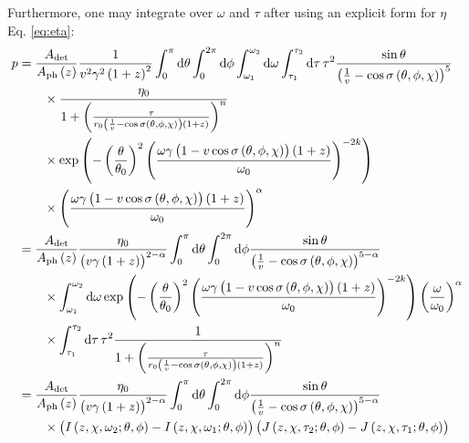 \documentclass[manuscript]{aastex}
\begin{document}
Furthermore, one may integrate over $\omega$ and $\tau$ after using an
explicit form for $\eta$ Eq. \ref{eq:eta}:
\begin{align}
p &= \frac{A_\text{det}}{A_\text{ph}\left(z\right)} \frac{1}{v^2 \gamma^2 \left(1+z\right)^2} \int_0^{\pi} \dif \theta \int_0^{2\pi} \dif \phi \int_{\omega_1}^{\omega_2} \dif \omega \int_{\tau_1}^{\tau_2} \dif \tau \, \tau^2 \frac{\sin\theta}{\left(\frac{1}{v} - \cos\sigma\left(\theta, \phi, \chi\right)\right)^5} \nonumber\\
&\qquad {} \times \frac{\eta_0}{1 + \left(\frac{\tau}{r_0\left(\frac{1}{v} - \cos\sigma\left(\theta, \phi, \chi\right)\right)\left(1+z\right)}\right)^n} \nonumber\\
&\qquad {} \times \exp\left(
	-\left(\frac{\theta}{\theta_0}\right)^2
	\left(\frac{\omega\gamma\left( 1 - v\cos\sigma\left(\theta, \phi, \chi\right) \right)\left(1+z\right)}{\omega_0}\right)^{-2k}
\right) \nonumber\\
&\qquad {} \times \left(\frac{\omega\gamma\left( 1 - v\cos\sigma\left(\theta, \phi, \chi\right) \right)\left(1+z\right)}{\omega_0}\right)^\alpha \nonumber\\
&= \frac{A_\text{det}}{A_\text{ph}\left(z\right)} \frac{\eta_0}{\left(v\gamma\left(1+z\right)\right)^{2-\alpha}} \int_0^{\pi} \dif \theta \int_0^{2\pi} \dif \phi \frac{\sin\theta}{\left(\frac{1}{v} - \cos\sigma\left(\theta, \phi, \chi\right)\right)^{5-\alpha}} \nonumber\\
&\qquad {} \times \int_{\omega_1}^{\omega_2} \dif \omega \exp\left(
	-\left(\frac{\theta}{\theta_0}\right)^2
	\left(\frac{\omega\gamma\left( 1 - v\cos\sigma\left(\theta, \phi, \chi\right) \right)\left(1+z\right)}{\omega_0}\right)^{-2k}
\right) \left(\frac{\omega}{\omega_0}\right)^\alpha \nonumber\\
&\qquad {} \times \int_{\tau_1}^{\tau_2} \dif \tau \, \tau^2 \frac{1}{1 + \left(\frac{\tau}{r_0\left(\frac{1}{v} - \cos\sigma\left(\theta, \phi, \chi\right)\right)\left(1+z\right)}\right)^n} \nonumber\\
&= \frac{A_\text{det}}{A_\text{ph}\left(z\right)}
\frac{\eta_0}{\left(v\gamma\left(1+z\right)\right)^{2-\alpha}}
\int_0^{\pi} \dif \theta \int_0^{2\pi} \dif \phi \frac{\sin\theta}{\left(\frac{1}{v} - \cos\sigma\left(\theta, \phi, \chi\right)\right)^{5-\alpha}} \nonumber\\
&\qquad {} \times \left( I\left(z,\chi,\omega_2; \theta,\phi\right) - I\left(z,\chi,\omega_1; \theta,\phi\right) \right) \left( J\left(z,\chi,\tau_2; \theta,\phi\right) - J\left( z,\chi,\tau_1; \theta,\phi \right) \right)
\end{align}
\end{document}
